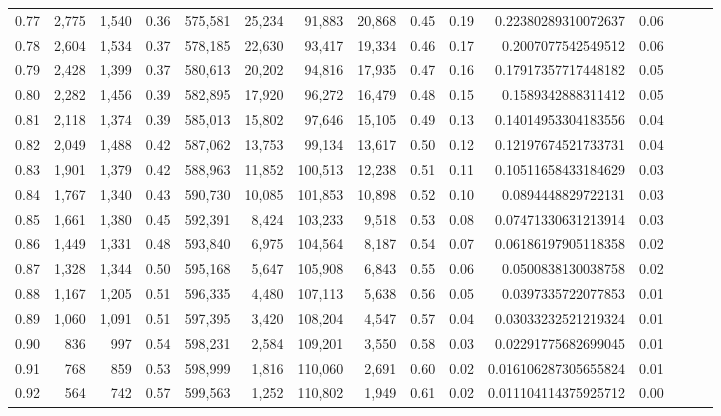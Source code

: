 \begin{tabular}{rrrrrrrrrrrrrrr}
0.77 &   2,775 &  1,540 &  0.36 &  575,581 &   25,234 &   91,883 &   20,868 &  0.45 &  0.19 &     0.22380289310072637 &      0.06 \\
0.78 &   2,604 &  1,534 &  0.37 &  578,185 &   22,630 &   93,417 &   19,334 &  0.46 &  0.17 &      0.2007077542549512 &      0.06 \\
0.79 &   2,428 &  1,399 &  0.37 &  580,613 &   20,202 &   94,816 &   17,935 &  0.47 &  0.16 &     0.17917357717448182 &      0.05 \\
0.80 &   2,282 &  1,456 &  0.39 &  582,895 &   17,920 &   96,272 &   16,479 &  0.48 &  0.15 &      0.1589342888311412 &      0.05 \\
0.81 &   2,118 &  1,374 &  0.39 &  585,013 &   15,802 &   97,646 &   15,105 &  0.49 &  0.13 &     0.14014953304183556 &      0.04 \\
0.82 &   2,049 &  1,488 &  0.42 &  587,062 &   13,753 &   99,134 &   13,617 &  0.50 &  0.12 &     0.12197674521733731 &      0.04 \\
0.83 &   1,901 &  1,379 &  0.42 &  588,963 &   11,852 &  100,513 &   12,238 &  0.51 &  0.11 &     0.10511658433184629 &      0.03 \\
0.84 &   1,767 &  1,340 &  0.43 &  590,730 &   10,085 &  101,853 &   10,898 &  0.52 &  0.10 &      0.0894448829722131 &      0.03 \\
0.85 &   1,661 &  1,380 &  0.45 &  592,391 &    8,424 &  103,233 &    9,518 &  0.53 &  0.08 &     0.07471330631213914 &      0.03 \\
0.86 &   1,449 &  1,331 &  0.48 &  593,840 &    6,975 &  104,564 &    8,187 &  0.54 &  0.07 &     0.06186197905118358 &      0.02 \\
0.87 &   1,328 &  1,344 &  0.50 &  595,168 &    5,647 &  105,908 &    6,843 &  0.55 &  0.06 &      0.0500838130038758 &      0.02 \\
0.88 &   1,167 &  1,205 &  0.51 &  596,335 &    4,480 &  107,113 &    5,638 &  0.56 &  0.05 &      0.0397335722077853 &      0.01 \\
0.89 &   1,060 &  1,091 &  0.51 &  597,395 &    3,420 &  108,204 &    4,547 &  0.57 &  0.04 &     0.03033232521219324 &      0.01 \\
0.90 &     836 &    997 &  0.54 &  598,231 &    2,584 &  109,201 &    3,550 &  0.58 &  0.03 &     0.02291775682699045 &      0.01 \\
0.91 &     768 &    859 &  0.53 &  598,999 &    1,816 &  110,060 &    2,691 &  0.60 &  0.02 &    0.016106287305655824 &      0.01 \\
0.92 &     564 &    742 &  0.57 &  599,563 &    1,252 &  110,802 &    1,949 &  0.61 &  0.02 &    0.011104114375925712 &      0.00 \\

\end{tabular}
